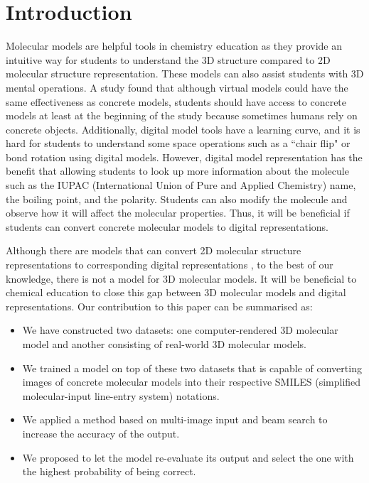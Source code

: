\documentclass[12pt]{article}
\begin{document}
\section{Introduction}
Molecular models are helpful tools in chemistry education as they provide an intuitive way for students to understand the 3D structure compared to 2D molecular structure representation. These models can also assist students with 3D mental operations. 
A study \autocite{savec_evaluating_2005} found that although virtual models could have the same effectiveness as concrete models, students should have access to concrete models at least at the beginning of the study because sometimes humans rely on concrete objects. Additionally, digital model tools have a learning curve, and it is hard for students to understand some space operations such as a ``chair flip" or bond rotation using digital models. 
However, digital model representation has the benefit that allowing students to look up more information about the molecule such as the IUPAC (International Union of Pure and Applied Chemistry) name, the boiling point, and the polarity. Students can also modify the molecule and observe how it will affect the molecular properties. Thus, it will be beneficial if students can convert concrete molecular models to digital representations. 


Although there are models that can convert 2D molecular structure representations to corresponding digital representations \autocite{swinocsr}\autocite{decimer}\autocite{chempix}, to the best of our knowledge, there is not a model for 3D molecular models. It will be beneficial to chemical education to close this gap between 3D molecular models and digital representations. 
Our contribution to this paper can be summarised as:
\begin{itemize}
\item We have constructed two datasets: one computer-rendered 3D molecular model and another consisting of real-world 3D molecular models.
\item We trained a model on top of these two datasets that is capable of converting images of concrete molecular models into their respective SMILES (simplified molecular-input line-entry system) notations. 
\item We applied a method based on multi-image input and beam search to increase the accuracy of the output.
\item  We proposed to let the model re-evaluate its output and select the one with the highest probability of being correct.
\end{itemize}
\end{document}
